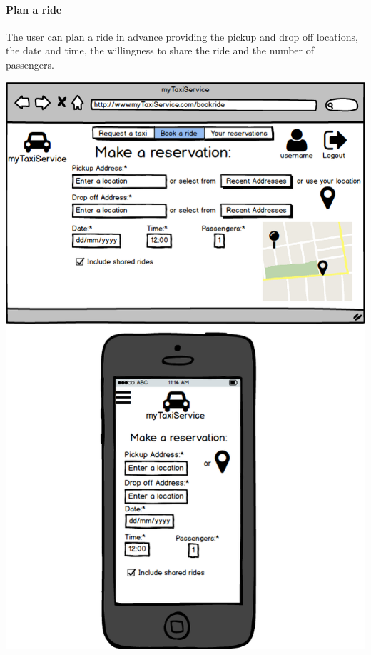 \documentclass[a4paper,11pt]{report} %
\begin{document}
	\paragraph{Plan a ride} The user can plan a ride in advance providing the pickup and drop off locations, the date and time, the willingness to share the ride and the number of passengers.
	\begin{center}
		\includegraphics[width=0.9\linewidth]{Pictures/PlanAndBookARide}
	\end{center}
	\pagebreak
	
\end{document}
